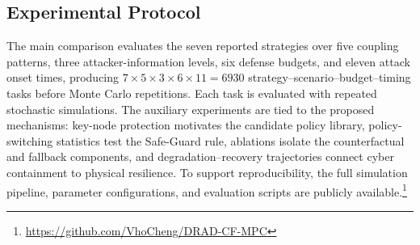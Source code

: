 \documentclass[lettersize,journal]{IEEEtran}
\begin{document}
\subsection{Experimental Protocol}
\label{subsec:experimental_design}

The main comparison evaluates the seven reported strategies over five coupling patterns, three attacker-information levels, six defense budgets, and eleven attack onset times, producing $7\times5\times3\times6\times11=6930$ strategy--scenario--budget--timing tasks before Monte Carlo repetitions. Each task is evaluated with repeated stochastic simulations. The auxiliary experiments are tied to the proposed mechanisms: key-node protection motivates the candidate policy library, policy-switching statistics test the Safe-Guard rule, ablations isolate the counterfactual and fallback components, and degradation--recovery trajectories connect cyber containment to physical resilience. To support reproducibility, the full simulation pipeline, parameter configurations, and evaluation scripts are publicly available.\footnote{\url{https://github.com/VhoCheng/DRAD-CF-MPC}}
\end{document}

